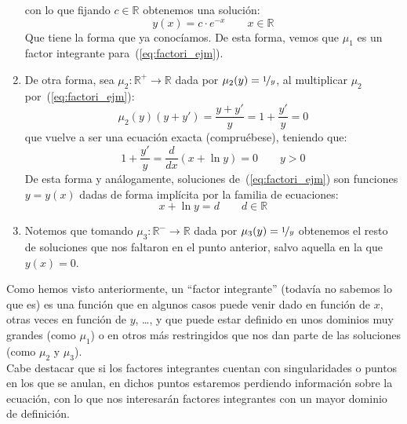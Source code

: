 \begin{ejemplo}
\begin{enumerate}
            con lo que fijando $c\in \mathbb{R}$ obtenemos una solución:
            \begin{equation*}
                y(x) = c\cdot e^{-x} \qquad x\in \mathbb{R}
            \end{equation*}
            Que tiene la forma que ya conocíamos. De esta forma, vemos que $\mu_1$ es un factor integrante para~(\ref{eq:factori_ejm}).
        \item De otra forma, sea $\mu_2:\mathbb{R}^+\rightarrow\mathbb{R}$ dada por $\mu_2(y) = \nicefrac{1}{y}$, al multiplicar $\mu_2$ por~(\ref{eq:factori_ejm}):
            \begin{equation*}
                \mu_2(y)(y+y') = \dfrac{y+y'}{y} = 1 + \dfrac{y'}{y} = 0
            \end{equation*}
            que vuelve a ser una ecuación exacta (compruébese), teniendo que:
            \begin{equation*}
                1 + \dfrac{y'}{y} = \dfrac{d}{dx}(x+\ln y) = 0 \qquad y>0
            \end{equation*}
            De esta forma y análogamente, soluciones de~(\ref{eq:factori_ejm}) son funciones $y=y(x)$ dadas de forma implícita por la familia de ecuaciones:
            \begin{equation*}
                x + \ln y = d \qquad d\in \mathbb{R}
            \end{equation*}
        \item Notemos que tomando $\mu_3:\mathbb{R}^-\rightarrow\mathbb{R}$ dada por $\mu_3(y) = \nicefrac{1}{y}$ obtenemos el resto de soluciones que nos faltaron en el punto anterior, salvo aquella en la que $y(x) = 0$.
    \end{enumerate}
\end{ejemplo}

Como hemos visto anteriormente, un ``factor integrante'' (todavía no sabemos lo que es) es una función que en algunos casos puede venir dado en función de $x$, otras veces en función de $y$, \ldots, y que puede estar definido en unos dominios muy grandes (como $\mu_1$) o en otros más restringidos que nos dan parte de las soluciones (como $\mu_2$ y $\mu_3$).\\

Cabe destacar que si los factores integrantes cuentan con singularidades o puntos en los que se anulan, en dichos puntos estaremos perdiendo información sobre la ecuación, con lo que nos interesarán factores integrantes con un mayor dominio de definición.

